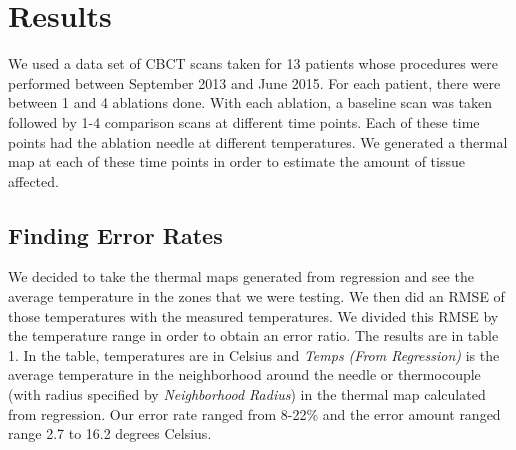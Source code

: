 \documentclass[]{spie}  %
\begin{document}
\section{Results}

We used a data set of CBCT scans taken for 13 patients whose procedures were performed between September 2013 and June 2015. For each patient, there were between 1 and 4 ablations done. With each ablation, a baseline scan was taken followed by 1-4 comparison scans at different time points. Each of these time points had the ablation needle at different temperatures. We generated a thermal map at each of these time points in order to estimate the amount of tissue affected. 

\subsection{Finding Error Rates}

We decided to take the thermal maps generated from regression and see the average temperature in the zones that we were testing. We then did an RMSE of those temperatures with the measured temperatures. We divided this RMSE by the temperature range in order to obtain an error ratio. The results are in table 1. In the table, temperatures are in Celsius and \textit{Temps (From Regression)} is the average temperature in the neighborhood around the needle or thermocouple (with radius specified by \textit{Neighborhood Radius}) in the thermal map calculated from regression. Our error rate ranged from 8-22\% and the error amount ranged range 2.7 to 16.2 degrees Celsius. 
\end{document}
